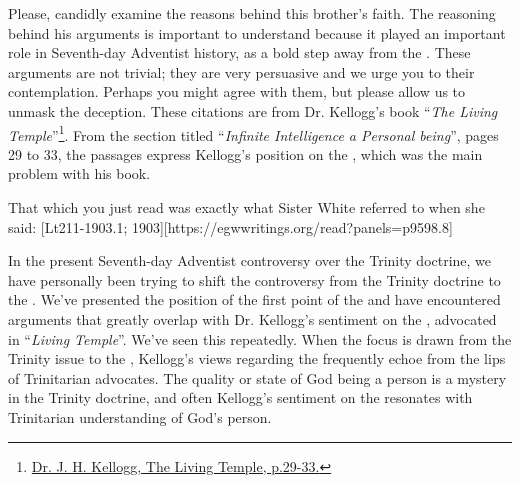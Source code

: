 Please, candidly examine the reasons behind this brother’s faith. The reasoning behind his arguments is important to understand because it played an important role in Seventh-day Adventist history, as a bold step away from the . These arguments are not trivial; they are very persuasive and we urge you to their contemplation. Perhaps you might agree with them, but please allow us to unmask the deception. These citations are from Dr. Kellogg’s book “\textit{The Living Temple}”\footnote{\href{https://archive.org/details/J.H.Kellogg.TheLivingTemple1903}{Dr. J. H. Kellogg, The Living Temple, p.29-33.}}. From the section titled “\textit{Infinite Intelligence a Personal being}”, pages 29 to 33, the passages express Kellogg’s position on the , which was the main problem with his book.

That which you just read was exactly what Sister White referred to when she said: [Lt211-1903.1; 1903][https://egwwritings.org/read?panels=p9598.8]

In the present Seventh-day Adventist controversy over the Trinity doctrine, we have personally been trying to shift the controversy from the Trinity doctrine to the . We’ve presented the position of the first point of the  and have encountered arguments that greatly overlap with Dr. Kellogg’s sentiment on the , advocated in “\textit{Living Temple}”. We’ve seen this repeatedly. When the focus is drawn from the Trinity issue to the , Kellogg’s views regarding the  frequently echoe from the lips of Trinitarian advocates. The quality or state of God being a person is a mystery in the Trinity doctrine, and often Kellogg’s sentiment on the  resonates with Trinitarian understanding of God’s person. 

